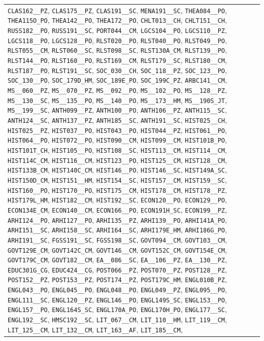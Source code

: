 \begin{longtable}{|p{4.4in}|p{4.4in}|}
\verb|CLAS162__PZ|, \verb|CLAS175__PZ|, \verb|CLAS191__SC|, \verb|MENA191__SC|, \verb|THEA084__PO|, \verb|THEA115O_PO|, \verb|THEA142__PO|, \verb|THEA172__PO|, \verb|CHLT013__CH|, \verb|CHLT151__CH|, \verb|RUSS182__PO|, \verb|RUSS191__SC|, \verb|PORT044__CM|, \verb|LGCS104__PO|, \verb|LGCS110__PZ|, \verb|LGCS118__PO|, \verb|LGCS128__PO|, \verb|RLST020__PO|, \verb|RLST040__PO|, \verb|RLST049__PO|, \verb|RLST055__CM|, \verb|RLST060__SC|, \verb|RLST098__SC|, \verb|RLST130A_CM|, \verb|RLST139__PO|, \verb|RLST144__PO|, \verb|RLST160__PO|, \verb|RLST169__CM|, \verb|RLST179__SC|, \verb|RLST180__CM|, \verb|RLST187__PO|, \verb|RLST191__SC|, \verb|SOC_030__CH|, \verb|SOC_118__PZ|, \verb|SOC_123__PO|, \verb|SOC_130__PO|, \verb|SOC_179D_HM|, \verb|SOC_189E_PO|, \verb|SOC_199C_PZ|, \verb|ARBC141__CM|, \verb|MS__060__PZ|, \verb|MS__070__PZ|, \verb|MS__092__PO|, \verb|MS__102__PO|, \verb|MS__128__PZ|, \verb|MS__130__SC|, \verb|MS__135__PO|, \verb|MS__140__PO|, \verb|MS__173__HM|, \verb|MS__190S_JT|, \verb|MS__199__SC|, \verb|ANTH099__PZ|, \verb|ANTH100__PO|, \verb|ANTH106__PZ|, \verb|ANTH115__SC|, \verb|ANTH124__SC|, \verb|ANTH137__PZ|, \verb|ANTH185__SC|, \verb|ANTH191__SC|, \verb|HIST025__CH|, \verb|HIST025__PZ|, \verb|HIST037__PO|, \verb|HIST043__PO|, \verb|HIST044__PZ|, \verb|HIST061__PO|, \verb|HIST064__PO|, \verb|HIST072__PO|, \verb|HIST090__CM|, \verb|HIST099__CM|, \verb|HIST101B_PO|, \verb|HIST101T_CH|, \verb|HIST105__PO|, \verb|HIST108__SC|, \verb|HIST113__CM|, \verb|HIST114__CM|, \verb|HIST114C_CM|, \verb|HIST116__CM|, \verb|HIST123__PO|, \verb|HIST125__CM|, \verb|HIST128__CM|, \verb|HIST133B_CM|, \verb|HIST140C_CM|, \verb|HIST146__PO|, \verb|HIST146__SC|, \verb|HIST149A_SC|, \verb|HIST150D_CM|, \verb|HIST151__HM|, \verb|HIST154__SC|, \verb|HIST157__CM|, \verb|HIST159__SC|, \verb|HIST160__PO|, \verb|HIST170__PO|, \verb|HIST175__CM|, \verb|HIST178__CM|, \verb|HIST178__PZ|, \verb|HIST179L_HM|, \verb|HIST182__CM|, \verb|HIST192__SC|, \verb|ECON120__PO|, \verb|ECON129__PO|, \verb|ECON134E_CM|, \verb|ECON140__CM|, \verb|ECON166__PO|, \verb|ECON191H_SC|, \verb|ECON199__PZ|, \verb|ARHI124__PO|, \verb|ARHI127__PO|, \verb|ARHI135__PZ|, \verb|ARHI139__PO|, \verb|ARHI141A_PO|, \verb|ARHI151__SC|, \verb|ARHI158__SC|, \verb|ARHI164__SC|, \verb|ARHI179E_HM|, \verb|ARHI186G_PO|, \verb|ARHI191__SC|, \verb|FGSS191__SC|, \verb|FGSS198__SC|, \verb|GOVT094__CM|, \verb|GOVT103__CM|, \verb|GOVT129E_CM|, \verb|GOVT142C_CM|, \verb|GOVT146__CM|, \verb|GOVT152C_CM|, \verb|GOVT154E_CM|, \verb|GOVT179C_CM|, \verb|GOVT182__CM|, \verb|EA__086__SC|, \verb|EA__106__PZ|, \verb|EA__130__PZ|, \verb|EDUC301G_CG|, \verb|EDUC424__CG|, \verb|POST066__PZ|, \verb|POST070__PZ|, \verb|POST128__PZ|, \verb|POST152__PZ|, \verb|POST153__PZ|, \verb|POST174__PZ|, \verb|POST179C_HM|, \verb|ENGL010B_PZ|, \verb|ENGL043__PO|, \verb|ENGL045__PO|, \verb|ENGL048__PO|, \verb|ENGL049__PZ|, \verb|ENGL095__PO|, \verb|ENGL111__SC|, \verb|ENGL120__PZ|, \verb|ENGL146__PO|, \verb|ENGL149S_SC|, \verb|ENGL153__PO|, \verb|ENGL157__PO|, \verb|ENGL164S_SC|, \verb|ENGL170A_PO|, \verb|ENGL170H_PO|, \verb|ENGL177__SC|, \verb|ENGL192__SC|, \verb|HMSC192__SC|, \verb|LIT_067__CM|, \verb|LIT_110__HM|, \verb|LIT_119__CM|, \verb|LIT_125__CM|, \verb|LIT_132__CM|, \verb|LIT_163__AF|, \verb|LIT_185__CM|, 
\end{longtable}
